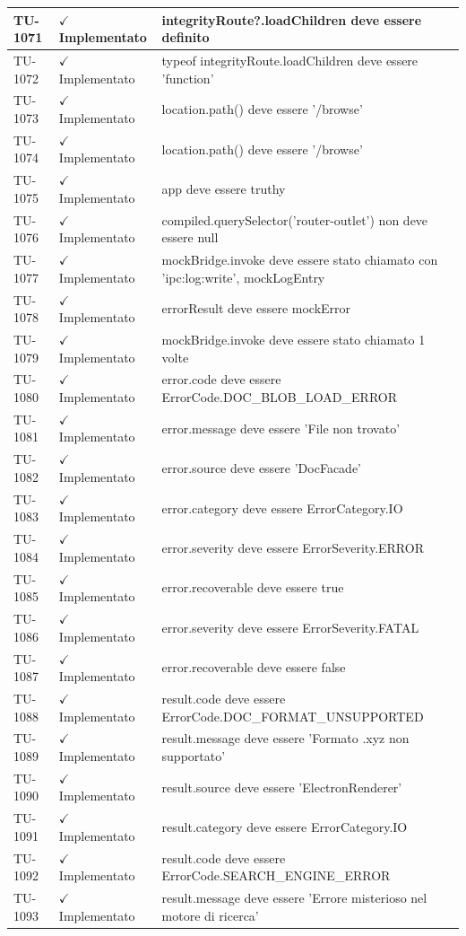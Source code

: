 ﻿\documentclass[a4paper,12pt]{article}
\newcommand{\ok}{\textcolor{green!60!black}{$\checkmark$ Implementato}}
\begin{document}
\begin{longtable}{|p{2cm}|p{3.5cm}|p{9.5cm}|}
\hline
TU-1071 & \ok & integrityRoute?.loadChildren deve essere definito \\
\hline
TU-1072 & \ok & typeof integrityRoute.loadChildren deve essere 'function' \\
\hline
TU-1073 & \ok & location.path() deve essere '/browse' \\
\hline
TU-1074 & \ok & location.path() deve essere '/browse' \\
\hline
TU-1075 & \ok & app deve essere truthy \\
\hline
TU-1076 & \ok & compiled.querySelector('router-outlet') non deve essere null \\
\hline
TU-1077 & \ok & mockBridge.invoke deve essere stato chiamato con 'ipc:log:write', mockLogEntry \\
\hline
TU-1078 & \ok & errorResult deve essere mockError \\
\hline
TU-1079 & \ok & mockBridge.invoke deve essere stato chiamato 1 volte \\
\hline
TU-1080 & \ok & error.code deve essere ErrorCode.DOC\_BLOB\_LOAD\_ERROR \\
\hline
TU-1081 & \ok & error.message deve essere 'File non trovato' \\
\hline
TU-1082 & \ok & error.source deve essere 'DocFacade' \\
\hline
TU-1083 & \ok & error.category deve essere ErrorCategory.IO \\
\hline
TU-1084 & \ok & error.severity deve essere ErrorSeverity.ERROR \\
\hline
TU-1085 & \ok & error.recoverable deve essere true \\
\hline
TU-1086 & \ok & error.severity deve essere ErrorSeverity.FATAL \\
\hline
TU-1087 & \ok & error.recoverable deve essere false \\
\hline
TU-1088 & \ok & result.code deve essere ErrorCode.DOC\_FORMAT\_UNSUPPORTED \\
\hline
TU-1089 & \ok & result.message deve essere 'Formato .xyz non supportato' \\
\hline
TU-1090 & \ok & result.source deve essere 'ElectronRenderer' \\
\hline
TU-1091 & \ok & result.category deve essere ErrorCategory.IO \\
\hline
TU-1092 & \ok & result.code deve essere ErrorCode.SEARCH\_ENGINE\_ERROR \\
\hline
TU-1093 & \ok & result.message deve essere 'Errore misterioso nel motore di ricerca' \\

\end{longtable}
\end{document}
